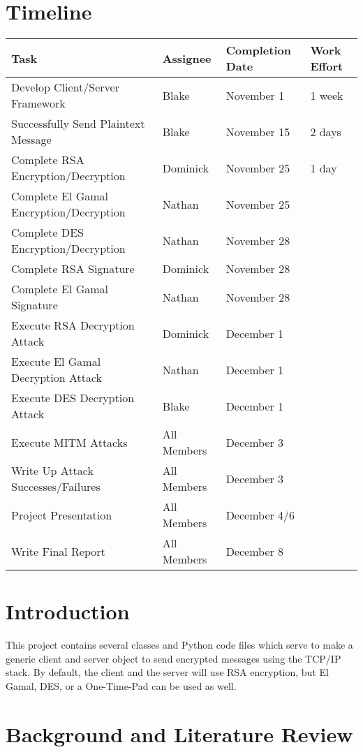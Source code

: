 \documentclass[12pt]{report}
\begin{document}
\section{Timeline}
\begin{tabular}{l|l|l|l}
    Task & Assignee & Completion Date & Work Effort\\ \hline
    Develop Client/Server Framework & Blake & November 1 & 1 week\\
    Successfully Send Plaintext Message & Blake & November 15 & 2 days\\
    Complete RSA Encryption/Decryption & Dominick & November 25 & 1 day\\
    Complete El Gamal Encryption/Decryption & Nathan & November 25 & \\
    Complete DES Encryption/Decryption & Nathan & November 28\\
    Complete RSA Signature & Dominick & November 28\\
    Complete El Gamal Signature & Nathan & November 28\\
    Execute RSA Decryption Attack & Dominick & December 1\\
    Execute El Gamal Decryption Attack & Nathan & December 1\\
    Execute DES Decryption Attack & Blake & December 1\\
    Execute MITM Attacks & All Members & December 3\\
    Write Up Attack Successes/Failures & All Members & December 3\\
    Project Presentation & All Members & December 4/6\\ 
    Write Final Report & All Members & December 8
\end{tabular}

\section{Introduction}
This project contains several classes and Python code files which serve to make a generic client and server object to send encrypted messages using the TCP/IP stack. By default, the client and the server will use RSA encryption, but El Gamal, DES, or a One-Time-Pad can be used as well. 

\section{Background and Literature Review}

\iffalse 
\newpage

\begin{thebibliography}{9}

    \bibitem{ieee}
    IEEE-CS/ACM Joint Task Force on Software Engineering Ethics and Professional Practices\\
    \texttt{https://www.computer.org/web/education/code-of-ethics}

\end{thebibliography}
\fi
\end{document}
